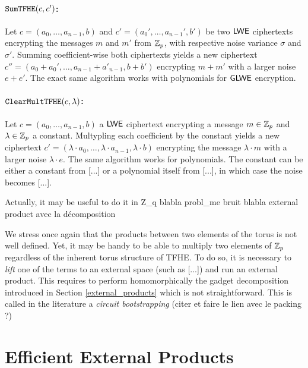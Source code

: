 \paragraph{$\texttt{SumTFHE}(c, c')$:} Let $c = (a_0, \dots, a_{n-1}, b)$ and $c' = (a_0', \dots, a_{n-1}', b')$ be two $\textsf{LWE}$ ciphertexts encrypting the messages $m$ and $m'$ from $\mathbb{Z}_p$, with respective noise variance $\sigma$ and $\sigma'$. Summing coefficient-wise both ciphertexts yields a new ciphertext $c'' = (a_0 + a_0', \dots, a_{n-1} + a'_{n-1}, b + b')$ encrypting $m + m'$ with a larger noise $e + e'$. The exact same algorithm works with polynomials for $\textsf{GLWE}$ encryption. 


\paragraph{$\texttt{ClearMultTFHE}(c, \lambda)$:} Let $c = (a_0, \dots, a_{n-1}, b)$ a $\textsf{LWE}$ ciphertext encrypting a message $m \in \mathbb{Z}_p$ and $\lambda \in \mathbb{Z}_p$ a constant. Multypling each coefficient by the constant yields a new ciphertext $c' = (\lambda \cdot a_0, \dots, \lambda \cdot a_{n-1}, \lambda \cdot b)$ encrypting the message $\lambda \cdot m$ with a larger noise $\lambda \cdot e$.
The same algorithm works for polynomials. The constant can be either a constant from [...] or a polynomial itself from [...], in which case the noise becomes [...].

Actually, it may be useful to do it in Z_q blabla probl_me bruit blabla external product avec la décomposition

We stress once again that the products between two elements of the torus is not well defined. Yet, it may be handy to be able to multiply two elements of $\mathbb{Z}_p$ regardless of the inherent torus structure of TFHE. To do so, it is necessary to \textit{lift} one of the terms to an external space (such as [...]) and run an external product. This requires to perform homomorphically the gadget decomposition introduced in Section \ref{external_products} which is not straightforward. This is called in the literature a \textit{circuit bootstrapping} (citer et faire le lien avec le packing ?)


\section{Efficient External Products}




